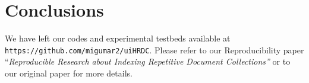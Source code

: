 \documentclass[review]{elsarticle}
\newcommand{\repair}{Re-Pair}
\newcommand{\repairNo}{\texttt{RePair}}
\newcommand{\rlcsa}{\texttt{RLCSA}}
\newcommand{\wcsa}{\texttt{WCSA}}
\newcommand{\slp}{\texttt{SLP}}
\newcommand{\wslp}{\texttt{WSLP}}
\newcommand{\lzindex}{\texttt{LZ77-index}}
\newcommand{\lzendindex}{\texttt{LZend-index}}
\begin{document}
%




\section{Conclusions}


We have left our codes and experimental testbeds available at
{\tt https://github.com/migumar2/uiHRDC}.
Please refer to our Reproducibility paper {``\em Reproducible Research about Indexing Repetitive Document Collections''} or to our original paper  \cite{CFMNis16.3} for more details.




\end{document}
